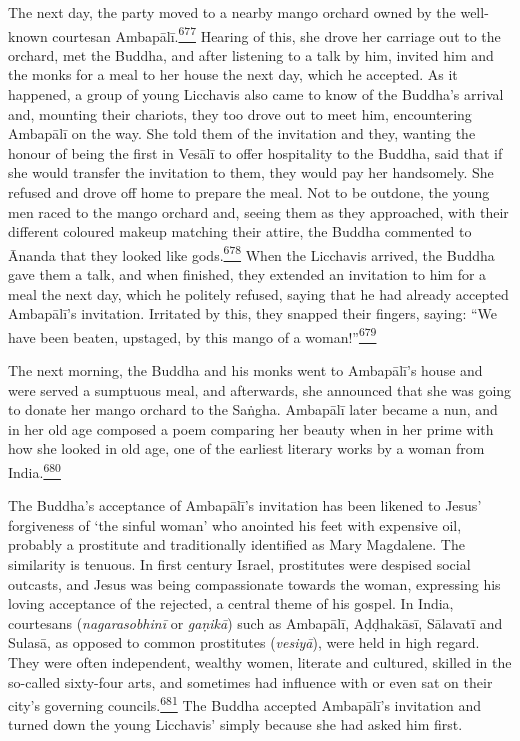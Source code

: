 The next day, the party moved to a nearby mango orchard owned by the
well-known courtesan
Ambapālī.\label{footprints_split_017.html_fnref677}\hyperref[footprints_split_025.htmlux5cux23fn677]{\textsuperscript{677}}
Hearing of this, she drove her carriage out to the orchard, met the
Buddha, and after listening to a talk by him, invited him and the monks
for a meal to her house the next day, which he accepted. As it happened,
a group of young Licchavis also came to know of the Buddha's arrival
and, mounting their chariots, they too drove out to meet him,
encountering Ambapālī on the way. She told them of the invitation and
they, wanting the honour of being the first in Vesālī to offer
hospitality to the Buddha, said that if she would transfer the
invitation to them, they would pay her handsomely. She refused and drove
off home to prepare the meal. Not to be outdone, the young men raced to
the mango orchard and, seeing them as they approached, with their
different coloured makeup matching their attire, the Buddha commented to
Ānanda that they looked like
gods.\label{footprints_split_017.html_fnref678}\hyperref[footprints_split_025.htmlux5cux23fn678]{\textsuperscript{678}}
When the Licchavis arrived, the Buddha gave them a talk, and when
finished, they extended an invitation to him for a meal the next day,
which he politely refused, saying that he had already accepted
Ambapālī's invitation. Irritated by this, they snapped their fingers,
saying: ``We have been beaten, upstaged, by this mango of a
woman!''\label{footprints_split_017.html_fnref679}\hyperref[footprints_split_025.htmlux5cux23fn679]{\textsuperscript{679}}

The next morning, the Buddha and his monks went to Ambapālī's house and
were served a sumptuous meal, and afterwards, she announced that she was
going to donate her mango orchard to the Saṅgha. Ambapālī later became a
nun, and in her old age composed a poem comparing her beauty when in her
prime with how she looked in old age, one of the earliest literary works
by a woman from
India.\label{footprints_split_017.html_fnref680}\hyperref[footprints_split_025.htmlux5cux23fn680]{\textsuperscript{680}}

The Buddha's acceptance of Ambapālī's invitation has been likened to
Jesus' forgiveness of `the sinful woman' who anointed his feet with
expensive oil, probably a prostitute and traditionally identified as
Mary Magdalene. The similarity is tenuous. In first century Israel,
prostitutes were despised social outcasts, and Jesus was being
compassionate towards the woman, expressing his loving acceptance of the
rejected, a central theme of his gospel. In India, courtesans
(\emph{nagarasobhinī} or \emph{gaṇikā}) such as Ambapālī, Aḍḍhakāsī,
Sālavatī and Sulasā, as opposed to common prostitutes (\emph{vesiyā}),
were held in high regard. They were often independent, wealthy women,
literate and cultured, skilled in the so-called sixty-four arts, and
sometimes had influence with or even sat on their city's governing
councils.\label{footprints_split_017.html_fnref681}\hyperref[footprints_split_025.htmlux5cux23fn681]{\textsuperscript{681}}
The Buddha accepted Ambapālī's invitation and turned down the young
Licchavis' simply because she had asked him first.

